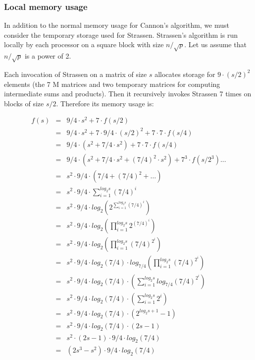 \documentclass{article}
\begin{document}
\subsubsection{Local memory usage}

In addition to the normal memory usage for Cannon's algorithm, we must consider
the temporary storage used for Strassen. Strassen's algorithm is run locally by
each processor on a square block with size $n/\sqrt{p}$. Let us assume that
$n/\sqrt{p}$ is a power of 2.

Each invocation of Strassen on a matrix of size $s$ allocates storage for
$9 \cdot (s/2)^2$ elements (the 7 M matrices and two temporary matrices for computing
intermediate sums and products). Then it recursively invokes Strassen 7 times on
blocks of size $s/2$. Therefore its memory usage is:

\begin{eqnarray*}
f(s) &=& 9/4\cdot s^2 + 7\cdot f(s/2)	\\
&=& 9/4\cdot  s^2 + 7\cdot  9/4\cdot  (s/2)^2 + 7\cdot  7\cdot  f(s/4)	\\
&=& 9/4\cdot  (s^2 + 7/4\cdot  s^2) + 7\cdot  7\cdot  f(s/4)	\\
&=& 9/4\cdot  ( s^2 + 7/4\cdot  s^2 + (7/4)^2\cdot  s^2 ) +7^3\cdot  f(s/2^3) ... 	\\
&=& s^2 \cdot   9/4 \cdot   (7/4 + (7/4)^2 + \dots)	\\
&=& s^2 \cdot   9/4 \cdot   \sum\limits_{i=1}^{log_2 s} (7/4)^i 	\\
&=& s^2 \cdot   9/4 \cdot   log_2\left(2^{\sum\limits_{i=1}^{log_2 s} (7/4)^i}\right) 	\\
&=& s^2 \cdot   9/4 \cdot   log_2\left(\prod\limits_{i=1}^{log_2 s} 2^{(7/4)^i}\right) 	\\
&=& s^2 \cdot   9/4 \cdot   log_2\left(\prod\limits_{i=1}^{log_2 s} (7/4)^{2^i}\right) 	\\
&=& s^2 \cdot   9/4 \cdot   log_2(7/4) \cdot   log_{7/4}\left(\prod\limits_{i=1}^{log_2 s} (7/4)^{2^i}\right) 	\\
&=& s^2 \cdot   9/4 \cdot   log_2(7/4) \cdot   \left(\sum\limits_{i=1}^{log_2 s} log_{7/4}(7/4)^{2^i}\right) 	\\
&=& s^2 \cdot   9/4 \cdot   log_2(7/4) \cdot   \left(\sum\limits_{i=1}^{log_2 s} 2^i\right) 	\\
&=& s^2 \cdot   9/4 \cdot   log_2(7/4) \cdot   (2^{log_2 s+1} - 1) 	\\
&=& s^2 \cdot   9/4 \cdot   log_2(7/4) \cdot   (2 s - 1) 	\\
&=& s^2 \cdot   (2  s - 1) \cdot   9/4 \cdot   log_2(7/4) 	\\
&=& (2  s^3 - s^2) \cdot   9/4 \cdot   log_2(7/4)
\end{eqnarray*}
\end{document}
